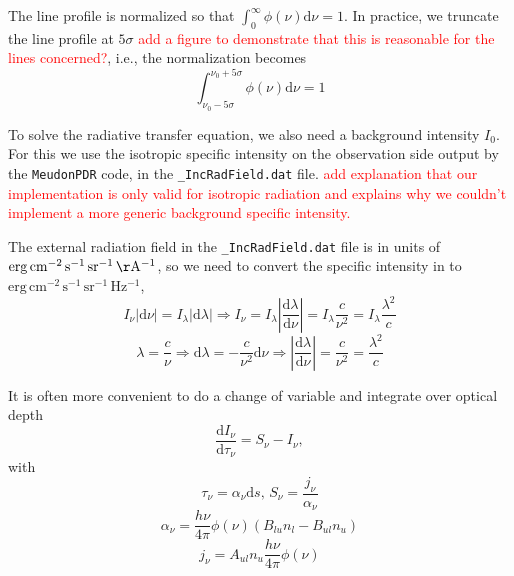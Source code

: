 \documentclass[12pt,a4paper]{article}
\newcommand{\mr}{\mathrm}
\newcommand{\fird}[2][]{\frac{\mathrm{d}#1}{\mathrm{d}#2}}
\newcommand{\dd}[1]{\mathrm{d}#1}
\newcommand{\mdpdr}{\texttt{MeudonPDR} code}
\newcommand{\qt}[1]{\textcolor{red}{#1}}
\begin{document}
The line profile is normalized so that $\int_0^{\infty} \phi(\nu) \dd{\nu} = 1$. In practice, we truncate the line profile at $5\sigma$ \qt{add a figure to demonstrate that this is reasonable for the lines concerned?}, i.e., the normalization becomes
\begin{equation}
    \int_{\nu_0 - 5\sigma}^{\nu_0 + 5\sigma}\phi(\nu) \dd{\nu} = 1
\end{equation}

To solve the radiative transfer equation, we also need a background intensity $I_0$. For this we use the isotropic specific intensity on the observation side output by the \mdpdr{}, in the \texttt{_IncRadField.dat} file. 
\qt{add explanation that our implementation is only valid for isotropic radiation and explains why we couldn't implement a more generic background specific intensity.}

The external radiation field in the \texttt{_IncRadField.dat} file is in units of $\mr{erg\,cm^{-2}\,s^{-1}\,sr^{-1}\,\AA^{-1}}$, so we need to convert the specific intensity in to $\mr{erg\,cm^{-2}\,s^{-1}\,sr^{-1}\,Hz^{-1}}$,
\begin{equation}
    I_\nu |\dd{\nu}| = I_\lambda |\dd{\lambda}|  \Rightarrow I_\nu = I_\lambda \left|\frac{\dd{\lambda}}{\dd{\nu}}\right| = I_\lambda \frac{c}{\nu^2} = I_\lambda \frac{\lambda^2}{c}
\end{equation}
\begin{equation}
    \lambda = \frac{c}{\nu} \Rightarrow \dd{\lambda} = -\frac{c}{\nu^2}\dd{\nu} \Rightarrow \left|\frac{\dd{\lambda}}{\dd{\nu}}\right| = \frac{c}{\nu^2} = \frac{\lambda^2}{c}
\end{equation}


It is often more convenient to do a change of variable and integrate over optical depth
\begin{equation}
    \fird[I_\nu]{\tau_\nu} = S_\nu - I_\nu,
\end{equation}
with 
\begin{equation}
    \tau_\nu = \alpha_\nu \dd{s},\,S_\nu = \frac{j_\nu}{\alpha_\nu}
\end{equation}
\begin{equation}
     \alpha_\nu = \frac{h\nu}{4\pi} \phi(\nu)(B_{lu}n_l - B_{ul} n_u)
\end{equation}
\begin{equation}
    j_\nu = A_{ul} n_u \frac{h\nu}{4\pi} \phi(\nu)
\end{equation}
\end{document}
